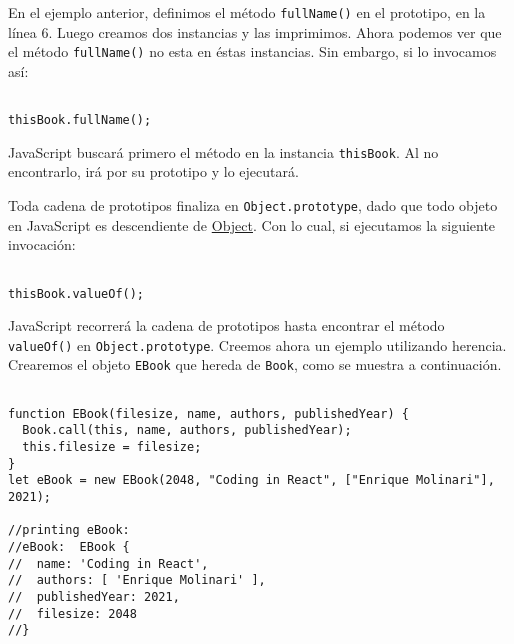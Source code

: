 \documentclass[a4paper, oneside, titlepage, 12pt]{book}
\begin{document}
En el ejemplo anterior, definimos el método \texttt{fullName()} en el prototipo, en la línea 6. Luego creamos dos instancias y las imprimimos. Ahora podemos ver que el método \texttt{fullName()} no esta en éstas instancias. Sin embargo, si lo invocamos así:

\begin{verbatim}

thisBook.fullName();
\end{verbatim}

JavaScript buscará primero el método en la instancia \texttt{thisBook}. Al no encontrarlo, irá por su prototipo y lo ejecutará.
\newline

Toda cadena de prototipos finaliza en \texttt{Object.prototype}, dado que todo objeto en JavaScript es descendiente de \href{https://developer.mozilla.org/es/docs/Web/JavaScript/Reference/Global_Objects/Object}{Object}. Con lo cual, si ejecutamos la siguiente invocación:

\begin{verbatim}

thisBook.valueOf();
\end{verbatim}

JavaScript recorrerá la cadena de prototipos hasta encontrar el método \texttt{valueOf()} en \texttt{Object.prototype}. Creemos ahora un ejemplo utilizando herencia. Crearemos el objeto \texttt{EBook} que hereda de \texttt{Book}, como se muestra a continuación.

\begin{verbatim}

function EBook(filesize, name, authors, publishedYear) {
  Book.call(this, name, authors, publishedYear);
  this.filesize = filesize;
}
let eBook = new EBook(2048, "Coding in React", ["Enrique Molinari"], 2021);

//printing eBook:
//eBook:  EBook {
//  name: 'Coding in React',
//  authors: [ 'Enrique Molinari' ],
//  publishedYear: 2021,
//  filesize: 2048
//}
\end{verbatim}
\end{document}
